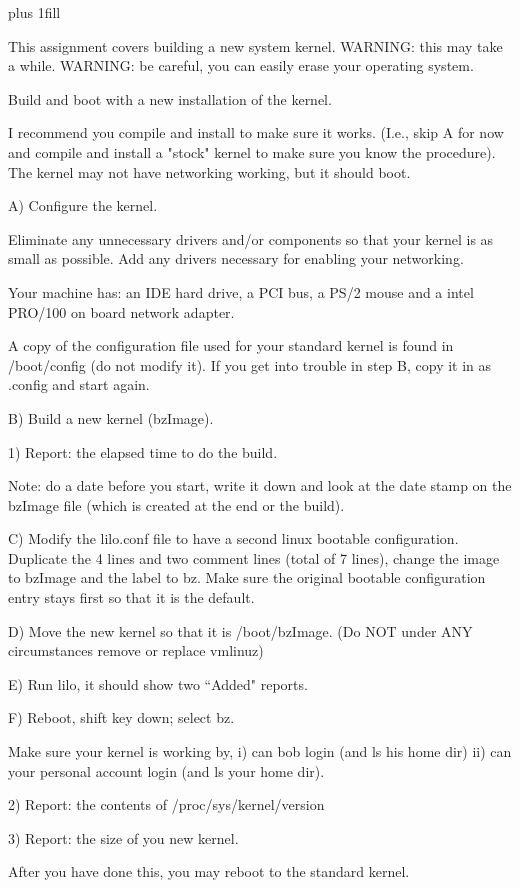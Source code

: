 
\rightskip=0pt plus 1fill

\parindent 0pt

This assignment covers building a new system kernel.
WARNING: this may take a while.
WARNING: be careful, you can easily erase your operating system.

Build and boot with a new installation of the kernel.


I recommend you compile and install to make sure it works.
(I.e., skip A for now and compile and install a "stock" kernel to
make sure you know the procedure).
The kernel may not have networking working, but it should boot.

A) Configure the kernel. 

Eliminate any unnecessary drivers and/or components so that your kernel is
as small as possible.
Add any drivers necessary for enabling your networking.

Your machine has:
an IDE hard drive, a PCI bus, a PS/2 mouse
and
a intel PRO/100 on board network adapter.

A copy of the configuration file used for your standard kernel
is found in {\ltt{}/boot/config} (do not modify it).
If you get into trouble in step B, copy it in as {\ltt{}.config}
and start again.

B) Build a new kernel ({\ltt{}bzImage}).

1) Report: the elapsed time to do the build.

Note: do a date before you start, write it down and look at
the date stamp on the {\ltt{}bzImage} file (which is created at
the end or the build).

C) Modify the {\ltt{}lilo.conf} file to have a second linux
bootable configuration.
Duplicate the 4 lines and two comment lines (total of 7 lines),
change the image to {\ltt{}bzImage} and the label to {\ltt{}bz}.
Make sure the original bootable configuration entry stays first so that
it is the default.

D) Move the new kernel so that it is {\ltt{}/boot/bzImage}.
(Do NOT under ANY circumstances remove or replace {\ltt{}vmlinuz})

E) Run lilo, it should show two ``Added" reports.

F) Reboot, shift key down; select bz.

Make sure your kernel is working by,
i) can bob login (and ls his home dir)
ii) can your personal account login (and ls your home dir). 

2) Report: the contents of {\ltt{}/proc/sys/kernel/version} 

3) Report: the size of you new kernel.

After you have done this, you may reboot to the standard kernel.
\bye
